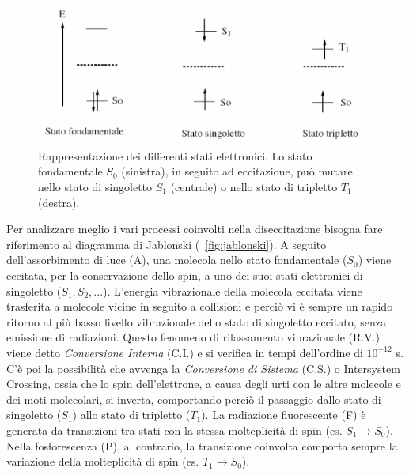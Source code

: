 \begin{figure}
 \centering
\includegraphics[scale=.40]{img/CAP1spin.png}
 \caption{\small{ Rappresentazione dei differenti stati elettronici. Lo stato fondamentale $S_0$ (sinistra), in seguito ad
eccitazione, può mutare nello stato di singoletto $S_1$ (centrale) o nello stato di tripletto $T_1$ (destra). }}
 \label{fig:spin}
\end{figure}

Per analizzare meglio i vari processi coinvolti nella diseccitazione bisogna fare riferimento al diagramma di Jablonski (\figurename~\ref{fig:jablonski}).
A seguito dell'assorbimento di luce (A), una molecola nello stato fondamentale ($S_0$) viene eccitata, per la conservazione dello spin, a uno dei suoi stati elettronici di singoletto ($S_1, S_2,...$). 
L'energia vibrazionale della molecola eccitata viene trasferita a molecole vicine in seguito a collisioni e perciò vi è sempre un rapido ritorno al più basso livello vibrazionale dello stato di singoletto eccitato, senza emissione di radiazioni.
Questo fenomeno di rilassamento vibrazionale (R.V.) viene detto \textit{Conversione Interna} (C.I.) e si verifica in tempi dell'ordine di $10^{-12}$ s. 
C'è poi la possibilità che avvenga la \textit{Conversione di Sistema} (C.S.) o Intersystem Crossing, ossia che lo spin dell'elettrone, a causa degli urti con le altre molecole e dei moti molecolari, si inverta, comportando perciò il passaggio dallo stato di singoletto ($S_1$) allo stato di tripletto ($T_1$). 
La radiazione fluorescente (F) è generata da transizioni tra stati con la stessa molteplicità di spin (es. $S_1 \to S_0$). 
Nella fosforescenza (P), al contrario, la transizione coinvolta comporta sempre la variazione della molteplicità di spin (es. $T_1 \to S_0$).

